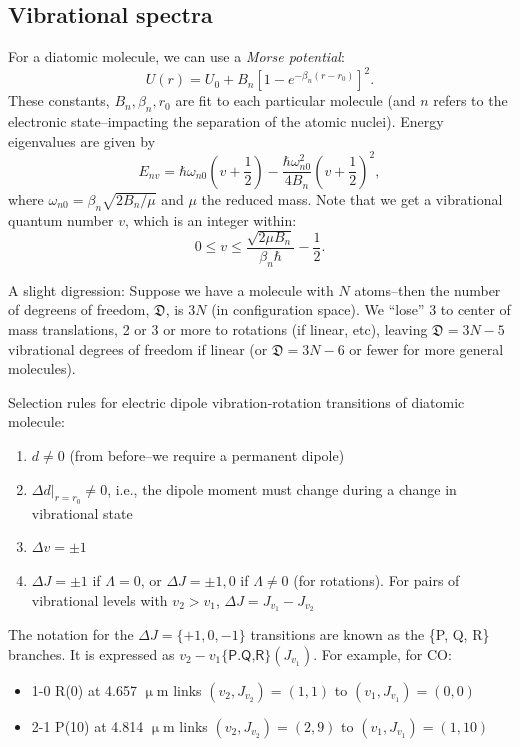 \documentclass{tufte-handout}
\renewcommand{\textrm}{\textsf}
\newcommand{\m}{\upmu} %
\newcommand{\um}{$\m{}$m}
\begin{document}
\subsection{Vibrational spectra}
For a diatomic molecule, we can use a \textit{Morse potential}:
\begin{equation}
U(r) = U_0 + B_n \left [1 - e^{-\beta_n (r-r_0)}\right ]^2.
\end{equation}
These constants, $B_n, \beta_n, r_0$ are fit to each particular molecule (and $n$ refers to the electronic state--impacting the separation of the atomic nuclei). Energy eigenvalues are given by
\begin{equation}
E_{nv} = \hbar \omega_{n0}\left (v + \frac{1}{2}\right ) - \frac{\hbar \omega_{n0}^2}{4 B_n}\left (v + \frac{1}{2}\right )^2,
\end{equation}
where $\omega_{n0} = \beta_n \sqrt{2B_n/\mu}$ and $\mu$ the reduced mass. Note that we get a vibrational quantum number $v$, which is an integer within:
\[0 \leq v \leq \frac{\sqrt{2\mu B_n}}{\beta_n \hbar} - \frac{1}{2}.\]

A slight digression: Suppose we have a molecule with $N$ atoms--then the number of degreens of freedom, $\mathfrak D$, is $3N$ (in configuration space). We ``lose'' 3 to center of mass translations, 2 or 3 or more to rotations (if linear, etc), leaving $\mathfrak D = 3N-5$ vibrational degrees of freedom if linear (or $\mathfrak D = 3N-6$ or fewer for more general molecules).

Selection rules for electric dipole vibration-rotation transitions of diatomic molecule:
\begin{enumerate}
\item $d \neq 0$ (from before--we require a permanent dipole)
\item $\Delta d |_{r=r_0} \neq 0$, i.e., the dipole moment must change during a change in vibrational state
\item $\Delta v = \pm 1$
\item $\Delta J = \pm 1$ if $\Lambda=0$, or $\Delta J = \pm 1, 0$ if $\Lambda \neq 0$ (for rotations). For pairs of vibrational levels with $v_2 > v_1$, $\Delta J = J_{v_1} - J_{v_2}$
\end{enumerate}
The notation for the $\Delta J = \{+1, 0, -1\}$ transitions are known as the \{P, Q, R\} branches. It is expressed as $v_2 - v_1 \{\textrm{P.Q,R}\}(J_{v_1})$. For example, for CO:
\begin{itemize}
\item[] 1-0 R(0) at 4.657 \um{} links $(v_2, J_{v_2}) = (1,1)$ to $(v_1,J_{v_1})=(0,0)$
\item[] 2-1 P(10) at 4.814 \um{} links $(v_2, J_{v_2}) = (2,9)$ to $(v_1, J_{v_1}) = (1,10)$
\end{itemize}
\end{document}
